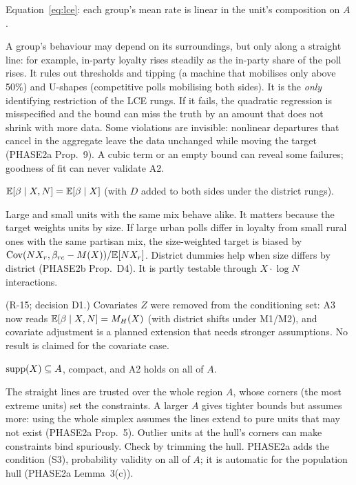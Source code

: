 \begin{assumption}
Equation~\eqref{eq:lce}: each group's mean rate is linear in the unit's
composition on $A$.
\end{assumption}
\begin{plain}
A group's behaviour may depend on its surroundings, but only along a straight
line: for example, in-party loyalty rises steadily as the in-party share of the
poll rises. It rules out thresholds and tipping (a machine that mobilises only
above 50\%) and U-shapes (competitive polls mobilising both sides). It is the
\emph{only} identifying restriction of the LCE rungs. If it fails, the
quadratic regression is misspecified and the bound can miss the truth by an
amount that does not shrink with more data. Some violations are invisible:
nonlinear departures that cancel in the aggregate leave the data unchanged
while moving the target (PHASE2a Prop.~9). A cubic term or an empty bound can
reveal some failures; goodness of fit can never validate A2.
\end{plain}

\begin{assumption}
$\mathbb E[\beta\mid X,N]=\mathbb E[\beta\mid X]$ (with $D$ added to both sides under the
district rungs).
\end{assumption}
\begin{plain}
Large and small units with the same mix behave alike. It matters because the
target weights units by size. If large urban polls differ in loyalty from small
rural ones with the same partisan mix, the size-weighted target is biased by
$\operatorname{Cov}(NX_r,\beta_{rc}-M(X))/\mathbb E[NX_r]$. District dummies help when size differs
by district (PHASE2b Prop.~D4). It is partly testable through $X\cdot\log N$
interactions.
\end{plain}
\begin{revnote}(R-15; decision D1.) Covariates $Z$ were removed from the conditioning set: A3 now reads $\mathbb E[\beta\mid X,N]=M_H(X)$ (with district shifts under M1/M2), and covariate adjustment is a planned extension that needs stronger assumptions. No result is claimed for the covariate case.\end{revnote}

\begin{assumption}
$\operatorname{supp}(X)\subseteq A$, compact, and A2 holds on all of $A$.
\end{assumption}
\begin{plain}
The straight lines are trusted over the whole region $A$, whose corners (the
most extreme units) set the constraints. A larger $A$ gives tighter bounds but
assumes more: using the whole simplex assumes the lines extend to pure units
that may not exist (PHASE2a Prop.~5). Outlier units at the hull's corners can
make constraints bind spuriously. Check by trimming the hull. PHASE2a adds
the condition (S3), probability validity on all of $A$; it is automatic for
the population hull (PHASE2a Lemma~3(c)).
\end{plain}

